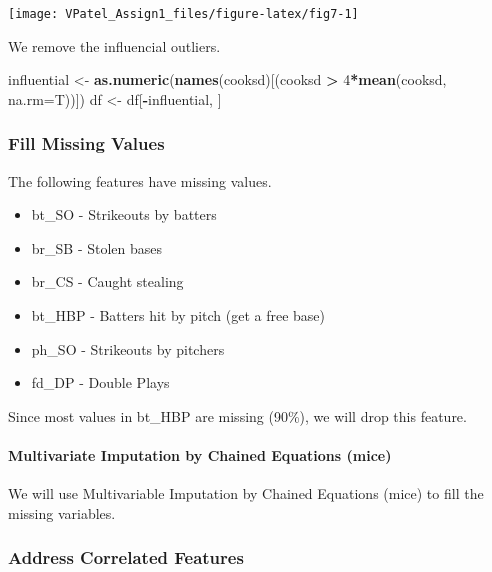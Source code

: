 \documentclass[]{article}
\newenvironment{Shaded}{\begin{snugshade}}{\end{snugshade}}
\newcommand{\DataTypeTok}[1]{\textcolor[rgb]{0.13,0.29,0.53}{#1}}
\newcommand{\DecValTok}[1]{\textcolor[rgb]{0.00,0.00,0.81}{#1}}
\newcommand{\KeywordTok}[1]{\textcolor[rgb]{0.13,0.29,0.53}{\textbf{#1}}}
\newcommand{\NormalTok}[1]{#1}
\newcommand{\OperatorTok}[1]{\textcolor[rgb]{0.81,0.36,0.00}{\textbf{#1}}}
\newcommand{\StringTok}[1]{\textcolor[rgb]{0.31,0.60,0.02}{#1}}
\providecommand{\tightlist}{%
  \setlength{\itemsep}{0pt}\setlength{\parskip}{0pt}}
\let\oldparagraph\paragraph
\renewcommand{\paragraph}[1]{\oldparagraph{#1}\mbox{}}
\begin{document}
\begin{center}\texttt{[image: VPatel\_Assign1\_files/figure-latex/fig7-1]} \end{center}

We remove the influencial outliers.

\begin{Shaded}
\begin{Highlighting}[]
\NormalTok{influential <-}\StringTok{ }\KeywordTok{as.numeric}\NormalTok{(}\KeywordTok{names}\NormalTok{(cooksd)[(cooksd }\OperatorTok{>}\StringTok{ }\DecValTok{4}\OperatorTok{*}\KeywordTok{mean}\NormalTok{(cooksd, }\DataTypeTok{na.rm=}\NormalTok{T))])}
\NormalTok{df <-}\StringTok{ }\NormalTok{df[}\OperatorTok{-}\NormalTok{influential, ]}
\end{Highlighting}
\end{Shaded}

\hypertarget{fill-missing-values}{%
\subsubsection{Fill Missing Values}\label{fill-missing-values}}

The following features have missing values.

\begin{itemize}
\tightlist
\item
  bt\_SO - Strikeouts by batters
\item
  br\_SB - Stolen bases
\item
  br\_CS - Caught stealing
\item
  bt\_HBP - Batters hit by pitch (get a free base)
\item
  ph\_SO - Strikeouts by pitchers
\item
  fd\_DP - Double Plays
\end{itemize}

Since most values in bt\_HBP are missing (90\%), we will drop this
feature.

\hypertarget{multivariate-imputation-by-chained-equations-mice}{%
\paragraph{Multivariate Imputation by Chained Equations
(mice)}\label{multivariate-imputation-by-chained-equations-mice}}

We will use Multivariable Imputation by Chained Equations (mice) to fill
the missing variables.

\hypertarget{address-correlated-features}{%
\subsubsection{Address Correlated
Features}\label{address-correlated-features}}
\end{document}
